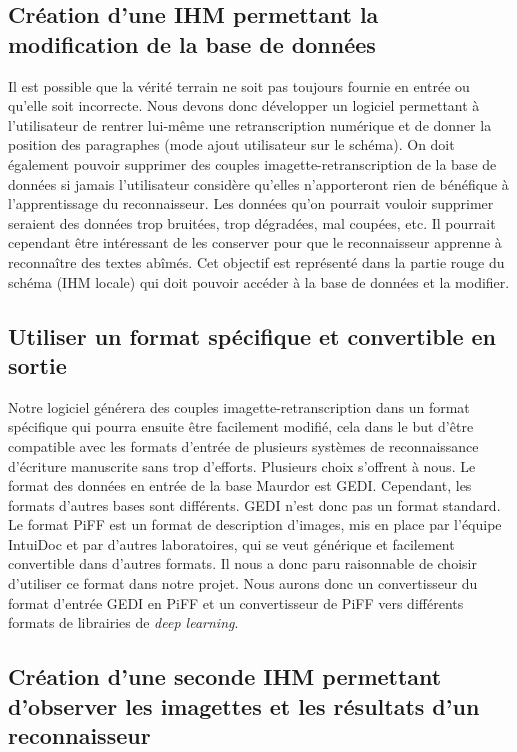 \subsection{Création d'une IHM permettant la modification de la base de données}

Il est possible que la vérité terrain ne soit pas toujours fournie en entrée ou qu’elle soit incorrecte.
Nous devons donc développer un logiciel permettant à l’utilisateur de rentrer lui-même une retranscription
numérique et de donner la position des paragraphes (mode ajout utilisateur sur le schéma). On doit également
pouvoir supprimer des couples imagette-retranscription de la base de données si jamais l’utilisateur considère
qu’elles n’apporteront rien de bénéfique à l’apprentissage du reconnaisseur. Les données qu’on pourrait vouloir
supprimer seraient des données trop bruitées, trop dégradées, mal coupées, etc. Il pourrait cependant être
intéressant de les conserver pour que le reconnaisseur apprenne à reconnaître des textes abîmés. Cet objectif
est représenté dans la partie rouge du schéma (IHM locale) qui doit pouvoir accéder à la base de données
et la modifier.

\subsection{Utiliser un format spécifique et convertible en sortie}

Notre logiciel générera des couples imagette-retranscription dans un format spécifique qui pourra ensuite être
facilement modifié, cela dans le but d’être compatible avec les formats d’entrée de plusieurs systèmes de
reconnaissance d’écriture manuscrite sans trop d’efforts. Plusieurs choix s’offrent à nous. Le format des données
en entrée de la base Maurdor est GEDI. Cependant, les formats d’autres bases sont différents. GEDI n’est donc pas
un format standard. Le format PiFF est un format de description d'images, mis en place par l'équipe IntuiDoc et par
d'autres laboratoires, qui se veut générique et facilement convertible dans d'autres formats. Il nous a donc paru
raisonnable de choisir d’utiliser ce format dans notre projet. Nous aurons donc un convertisseur du format d’entrée
GEDI en PiFF et un convertisseur de PiFF vers différents formats de librairies de \textit{deep learning}.

\subsection{Création d'une seconde IHM permettant d'observer les imagettes et les résultats d'un reconnaisseur}

